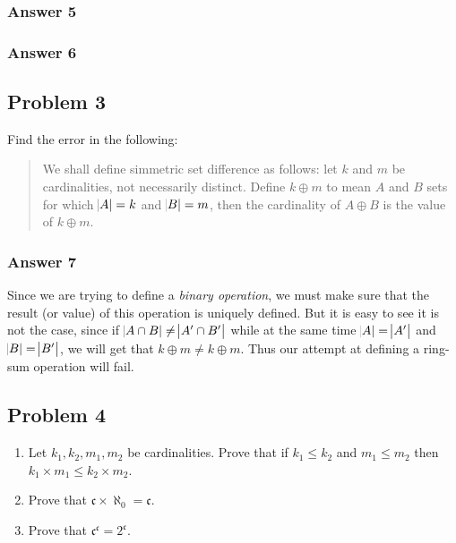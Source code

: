 \documentclass[11pt]{article}
\begin{document}
\subsubsection{Answer 5}
\label{sec-1-2-4}

\subsubsection{Answer 6}
\label{sec-1-2-5}
\subsection{Problem 3}
\label{sec-1-3}
Find the error in the following:

\begin{quote}
We shall define simmetric set difference as follows: let $k$ and $m$ be cardinalities,
not necessarily distinct.  Define $k \oplus m$ to mean $A$ and $B$ sets for which
$\abs{A} = k$ and $\abs{B} = m$, then the cardinality of $A \oplus B$ is the value
of $k \oplus m$.
\end{quote}

\subsubsection{Answer 7}
\label{sec-1-3-1}
Since we are trying to define a \emph{binary operation}, we must make sure that the
result (or value) of this operation is uniquely defined.  But it is easy to see
it is not the case, since if $\abs{A \cap B} \neq \abs{A' \cap B'}$
while at the same time $\abs{A} = \abs{A'}$ and $\abs{B} = \abs{B'}$, we will get
that $k \oplus m \neq k \oplus m$.  Thus our attempt at defining a ring-sum
operation will fail.
\subsection{Problem 4}
\label{sec-1-4}
\begin{enumerate}
\item Let $k_1, k_2, m_1, m_2$ be cardinalities. Prove that if $k_1 \leq k_2$ and
      $m_1 \leq m_2$ then $k_1 \times m_1 \leq k_2 \times m_2$.
\item Prove that $\mathfrak{c} \times \aleph_0 = \mathfrak{c}$.
\item Prove that $\mathfrak{c}^{\mathfrak{c}} = 2^{\mathfrak{c}}$.
\end{enumerate}
\end{document}
